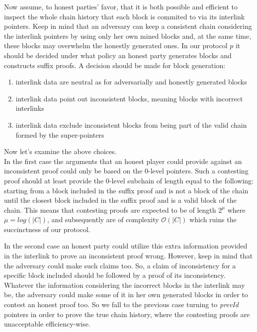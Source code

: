 Now assume, to honest parties' favor, that it is both possible and efficient to inspect
the whole chain history that each block is commited to via its interlink pointers. Keep
in mind that an adversary can keep a consistent chain considering the interlink pointers
by using only her own mined blocks and, at the same time, these blocks may overwhelm
the honestly generated ones. In our protocol $p$ it should be decided  under what policy
an honest party generates blocks and constructs suffix proofs. A decision should be made
for block generation:
\begin{enumerate}
\item interlink data are neutral as for adversarially and honestly generated blocks
\item interlink data point out inconsistent blocks, meaning blocks with incorrect
interlinks\item interlink data exclude inconsistent blocks from being part of the
valid chain formed by the super-pointers
\end{enumerate}
Now let's examine the above choices. \\
In the first case the arguments that an honest player could provide against an
inconsistent proof could only be based on the 0-level pointers. Such a contesting
proof should at least provide the 0-level subchain of length equal to the
following: starting from a block included in the suffix proof and is not a
block of the chain until the closest block included in the suffix proof and is
a valid block of the chain. This means that contesting proofs are expected to
be of length $2^\mu$ where $\mu = log(|C|)$, and subsequently are of complexity
$\mathcal{O}(|C|)$ which ruins the succinctness of our protocol.

In the second case an honest party could utilize this extra information provided
in the interlink to prove an inconsistent proof wrong. However, keep in mind that
the adversary could make such claims too. So, a claim of inconsistency for a
specific block included should be followed by a proof of its inconsistency.
Whatever the information considering the incorrect blocks in the interlink may
be, the adversary could make some of it in her own generated blocks in order to
contest an honest proof too. So we fall to the previous case turning to
\textit{prevId} pointers in order to prove the true chain history, where the
contesting proofs are unacceptable efficiency-wise.

